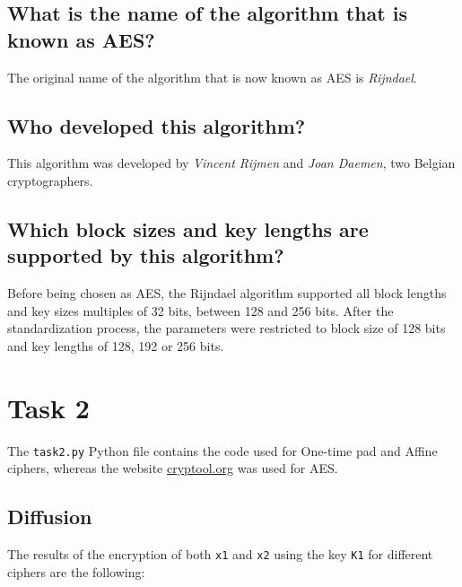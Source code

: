\documentclass{article}
\begin{document}
\subsection{What is the name of the algorithm that is known as AES?}
The original name of the algorithm that is now known as AES is \textit{Rijndael}.

\subsection{Who developed this algorithm?}
This algorithm was developed by \textit{Vincent Rijmen} and \textit{Joan Daemen}, two Belgian cryptographers.

\subsection{Which block sizes and key lengths are supported by this algorithm?}
Before being chosen as AES, the Rijndael algorithm supported all block lengths and key sizes multiples of 32 bits, between 128 and 256 bits.
After the standardization process, the parameters were restricted to block size of 128 bits and key lengths of 128, 192 or 256 bits.

\section{Task 2}
The \texttt{task2.py} Python file contains the code used for One-time pad and Affine ciphers, whereas the website \href{https://www.cryptool.org/en/cto/aes-step-by-step}{cryptool.org} was used for AES.

\subsection{Diffusion}
The results of the encryption of both \texttt{x1} and \texttt{x2} using the key \texttt{K1} for different ciphers are the following:
\end{document}
